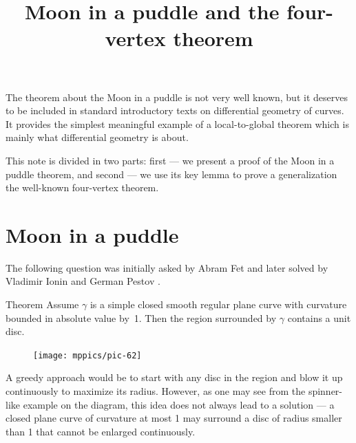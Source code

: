 \documentclass{article}
\begin{document}

\BgThispage

\title{Moon in a puddle and the four-vertex theorem}
\author{%
}
\date{}
\maketitle

\thispagestyle{empty}\newpage

The theorem about the Moon in a puddle is not very well known, but it deserves to be included in standard introductory texts on differential geometry of curves.
It provides the simplest meaningful example of a local-to-global theorem which is mainly what differential geometry is about.

This note is divided in two parts:  first --- we present a proof of the Moon in a puddle theorem, and second --- we use its key lemma to prove a generalization the well-known four-vertex theorem.


\section*{Moon in a puddle}

The following question was initially asked by Abram Fet and later solved by Vladimir Ionin and German Pestov \cite{pestov-ionin}.

\begin{thm}{Theorem}\label{thm:moon-orginal}
Assume $\gamma$ is a simple closed smooth regular plane curve with curvature bounded in absolute value by~1.
Then the region surrounded by $\gamma$ contains a unit disc.
\end{thm}


{

\begin{figure}
\vskip-6mm
\centering
\texttt{[image: mppics/pic-62]}
\vskip0mm
\end{figure}

A greedy approach would be to start with any disc in the region and blow it up continuously to maximize its radius.
However, as one may see from the spinner-like example on the diagram, this idea does not always lead to a solution --- a closed plane curve of curvature at most 1 may surround a disc of radius smaller than 1 that cannot be enlarged continuously.

}
\end{document}
